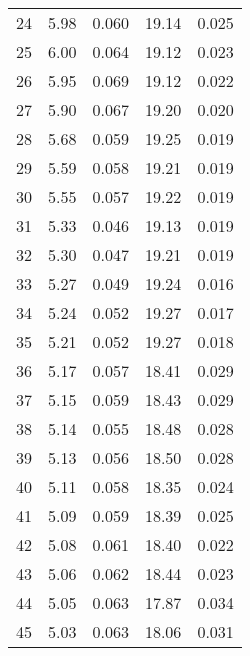 \begin{table}
\begin{tabular}{c|ll|ll}
24 & 5.98 & 0.060 & 19.14 & 0.025 \\
25 & 6.00 & 0.064 & 19.12 & 0.023 \\
26 & 5.95 & 0.069 & 19.12 & 0.022 \\
27 & 5.90 & 0.067 & 19.20 & 0.020 \\
28 & 5.68 & 0.059 & 19.25 & 0.019 \\
29 & 5.59 & 0.058 & 19.21 & 0.019 \\
30 & 5.55 & 0.057 & 19.22 & 0.019 \\
31 & 5.33 & 0.046 & 19.13 & 0.019 \\
32 & 5.30 & 0.047 & 19.21 & 0.019 \\
33 & 5.27 & 0.049 & 19.24 & 0.016 \\
34 & 5.24 & 0.052 & 19.27 & 0.017 \\
35 & 5.21 & 0.052 & 19.27 & 0.018 \\
36 & 5.17 & 0.057 & 18.41 & 0.029 \\
37 & 5.15 & 0.059 & 18.43 & 0.029 \\
38 & 5.14 & 0.055 & 18.48 & 0.028 \\
39 & 5.13 & 0.056 & 18.50 & 0.028 \\
40 & 5.11 & 0.058 & 18.35 & 0.024 \\
41 & 5.09 & 0.059 & 18.39 & 0.025 \\
42 & 5.08 & 0.061 & 18.40 & 0.022 \\
43 & 5.06 & 0.062 & 18.44 & 0.023 \\
44 & 5.05 & 0.063 & 17.87 & 0.034 \\
45 & 5.03 & 0.063 & 18.06 & 0.031 \\
               \hline
        \end{tabular}
    \end{table}
    \clearpage

